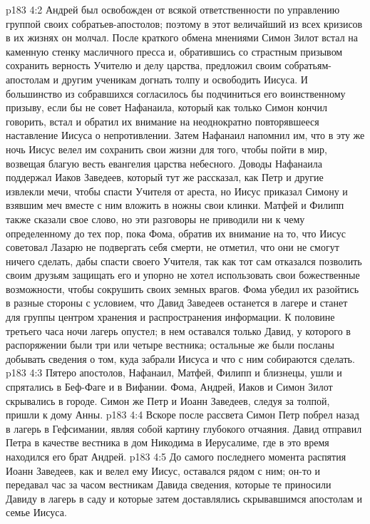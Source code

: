 \vs p183 4:2 Андрей был освобожден от всякой ответственности по управлению группой своих собратьев\hyp{}апостолов; поэтому в этот величайший из всех кризисов в их жизнях он молчал. После краткого обмена мнениями Симон Зилот встал на каменную стенку масличного пресса и, обратившись со страстным призывом сохранить верность Учителю и делу царства, предложил своим собратьям\hyp{}апостолам и другим ученикам догнать толпу и освободить Иисуса. И большинство из собравшихся согласилось бы подчиниться его воинственному призыву, если бы не совет Нафанаила, который как только Симон кончил говорить, встал и обратил их внимание на неоднократно повторявшееся наставление Иисуса о непротивлении. Затем Нафанаил напомнил им, что в эту же ночь Иисус велел им сохранить свои жизни для того, чтобы пойти в мир, возвещая благую весть евангелия царства небесного. Доводы Нафанаила поддержал Иаков Заведеев, который тут же рассказал, как Петр и другие извлекли мечи, чтобы спасти Учителя от ареста, но Иисус приказал Симону и взявшим меч вместе с ним вложить в ножны свои клинки. Матфей и Филипп также сказали свое слово, но эти разговоры не приводили ни к чему определенному до тех пор, пока Фома, обратив их внимание на то, что Иисус советовал Лазарю не подвергать себя смерти, не отметил, что они не смогут ничего сделать, дабы спасти своего Учителя, так как тот сам отказался позволить своим друзьям защищать его и упорно не хотел использовать свои божественные возможности, чтобы сокрушить своих земных врагов. Фома убедил их разойтись в разные стороны с условием, что Давид Заведеев останется в лагере и станет для группы центром хранения и распространения информации. К половине третьего часа ночи лагерь опустел; в нем оставался только Давид, у которого в распоряжении были три или четыре вестника; остальные же были посланы добывать сведения о том, куда забрали Иисуса и что с ним собираются сделать.
\vs p183 4:3 Пятеро апостолов, Нафанаил, Матфей, Филипп и близнецы, ушли и спрятались в Беф\hyp{}Фаге и в Вифании. Фома, Андрей, Иаков и Симон Зилот скрывались в городе. Симон же Петр и Иоанн Заведеев, следуя за толпой, пришли к дому Анны.
\vs p183 4:4 Вскоре после рассвета Симон Петр побрел назад в лагерь в Гефсимании, являя собой картину глубокого отчаяния. Давид отправил Петра в качестве вестника в дом Никодима в Иерусалиме, где в это время находился его брат Андрей.
\vs p183 4:5 До самого последнего момента распятия Иоанн Заведеев, как и велел ему Иисус, оставался рядом с ним; он\hyp{}то и передавал час за часом вестникам Давида сведения, которые те приносили Давиду в лагерь в саду и которые затем доставлялись скрывавшимся апостолам и семье Иисуса.
